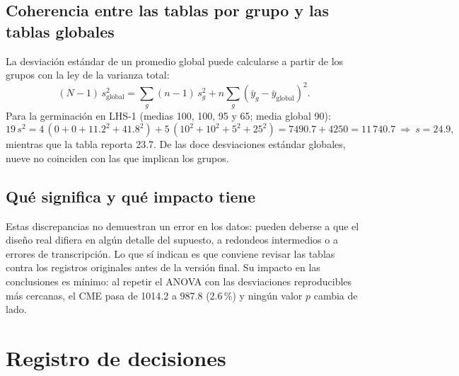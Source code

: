 \documentclass[11pt]{article}
\begin{document}
\subsection{Coherencia entre las tablas por grupo y las tablas globales}

La desviación estándar de un promedio global puede calcularse a partir de los grupos con la ley de la varianza total:
\[
(N - 1)\, s_{\text{global}}^2 = \sum_g (n - 1)\, s_g^2 + n \sum_g (\bar{y}_g - \bar{y}_{\text{global}})^2 .
\]
Para la germinación en LHS-1 (medias 100, 100, 95 y 65; media global 90):
\[
19\, s^2 = 4\,(0 + 0 + 11.2^2 + 41.8^2) + 5\,(10^2 + 10^2 + 5^2 + 25^2) = 7490.7 + 4250 = 11\,740.7
\ \Longrightarrow\ s = 24.9,
\]
mientras que la tabla reporta 23.7. De las doce desviaciones estándar globales, nueve no coinciden con las que implican los grupos.

\subsection{Qué significa y qué impacto tiene}

Estas discrepancias no demuestran un error en los datos: pueden deberse a que el diseño real difiera en algún detalle del supuesto, a redondeos intermedios o a errores de transcripción. Lo que sí indican es que conviene revisar las tablas contra los registros originales antes de la versión final. Su impacto en las conclusiones es mínimo: al repetir el ANOVA con las desviaciones reproducibles más cercanas, el CME pasa de 1014.2 a 987.8 (2.6\,\%) y ningún valor $p$ cambia de lado.

\section{Registro de decisiones}
\end{document}
